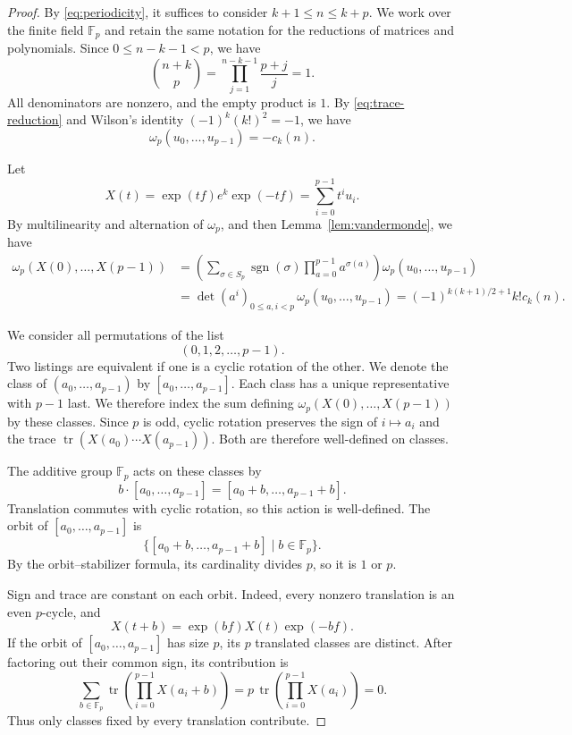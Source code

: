\documentclass[12pt]{article}
\theoremstyle{definition}
\theoremstyle{remark}
\DeclareMathOperator{\tr}{tr}
\DeclareMathOperator{\sgn}{sgn}
\newcommand{\Fp}{\mathbb F_p}
\begin{document}
\begin{proof}
By \eqref{eq:periodicity}, it suffices to consider $k+1\leq n\leq k+p$.
We work over the finite field $\Fp$ and retain the same notation
for the reductions of matrices and polynomials.
Since $0\leq n-k-1<p$, we have
\[
 \binom{n+k}{p}
 =\prod_{j=1}^{n-k-1}\frac{p+j}{j}=1.
\]
All denominators are nonzero, and the empty product is $1$.
By \eqref{eq:trace-reduction} and Wilson's identity
$(-1)^k(k!)^2=-1$, we have
\[
 \omega_p(u_0,\ldots,u_{p-1})=-c_k(n).
\]

Let
\[
 X(t)=\exp(tf)e^k\exp(-tf)=\sum_{i=0}^{p-1}t^iu_i.
\]
By multilinearity and alternation of $\omega_p$, and then
Lemma~\ref{lem:vandermonde}, we have
\begin{equation}\label{eq:finite-field-evaluation}
\begin{aligned}
 \omega_p(X(0),\ldots,X(p-1))
 &=\left(\sum_{\sigma\in S_p}\sgn(\sigma)
 \prod_{a=0}^{p-1}a^{\sigma(a)}\right)
 \omega_p(u_0,\ldots,u_{p-1})\\
 &=\det(a^i)_{0\leq a,i<p}\,
 \omega_p(u_0,\ldots,u_{p-1})
 =(-1)^{k(k+1)/2+1}k!c_k(n).
\end{aligned}
\end{equation}

\begin{samepage}
We consider all permutations of the list
\[
 (0,1,2,\ldots,p-1).
\]
Two listings are equivalent if one is a cyclic rotation of the other.
We denote the class of $(a_0,\ldots,a_{p-1})$ by
$[a_0,\ldots,a_{p-1}]$. Each class has a unique representative with
$p-1$ last. We therefore index the sum defining
$\omega_p(X(0),\ldots,X(p-1))$ by these classes.
Since $p$ is odd, cyclic
rotation preserves the sign of $i\mapsto a_i$ and the trace
$\tr(X(a_0)\cdots X(a_{p-1}))$. Both are therefore well-defined on classes.

The additive group $\Fp$ acts on these classes by
\[
 b\cdot[a_0,\ldots,a_{p-1}]=[a_0+b,\ldots,a_{p-1}+b].
\]
Translation commutes with cyclic rotation, so this action is well-defined.
The orbit of $[a_0,\ldots,a_{p-1}]$ is
\[
 \bigl\{[a_0+b,\ldots,a_{p-1}+b]\mid b\in\Fp\bigr\}.
\]
By the orbit--stabilizer formula, its cardinality divides $p$,
so it is $1$ or $p$.
\end{samepage}

Sign and trace are constant on each orbit. Indeed, every nonzero
translation is an even $p$-cycle, and
\[
 X(t+b)=\exp(bf)X(t)\exp(-bf).
\]
If the orbit of $[a_0,\ldots,a_{p-1}]$ has size $p$, its $p$
translated classes are distinct.
After factoring out their common sign, its contribution is
\[
 \sum_{b\in\Fp}\tr\!\left(\prod_{i=0}^{p-1}X(a_i+b)\right)
 =p\,\tr\!\left(\prod_{i=0}^{p-1}X(a_i)\right)=0.
\]
Thus only classes fixed by every translation contribute.


\end{proof}
\end{document}
